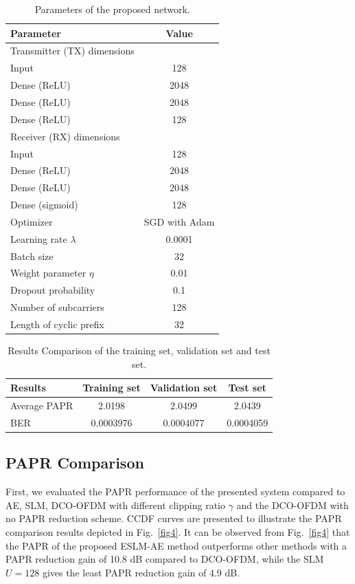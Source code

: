 \documentclass[conference]{IEEEtran}
\begin{document}
\begin{table}[htbp]
\caption{Parameters of the proposed network.}
\begin{center}
\begin{tabular}{|l|c|}
\hline
\textbf{Parameter} & \textbf{Value} \\
\hline
Transmitter (TX) dimensions & \\
Input & 128 \\
Dense (ReLU) & 2048 \\
Dense (ReLU) & 2048 \\
Dense (ReLU) & 128 \\
\hline
Receiver (RX) dimensions & \\
Input & 128 \\
Dense (ReLU) & 2048 \\
Dense (ReLU) & 2048 \\
Dense (sigmoid) & 128 \\
\hline
Optimizer & SGD with Adam \cite{b40} \\
Learning rate $\lambda$ & 0.0001 \\
Batch size & 32 \\
Weight parameter $\eta$ & 0.01 \\
Dropout probability & 0.1 \\
Number of subcarriers & 128 \\
Length of cyclic prefix & 32 \\
\hline
\end{tabular}
\label{tab1}
\end{center}
\end{table}

\begin{table}[htbp]
\caption{Results Comparison of the training set, validation set and test set.}
\begin{center}
\begin{tabular}{|l|c|c|c|}
\hline
\textbf{Results} & \textbf{Training set} & \textbf{Validation set} & \textbf{Test set} \\
\hline
Average PAPR & 2.0198 & 2.0499 & 2.0439 \\
BER & 0.0003976 & 0.0004077 & 0.0004059 \\
\hline
\end{tabular}
\label{tab2}
\end{center}
\end{table}

\subsection{PAPR Comparison}
First, we evaluated the PAPR performance of the presented system compared to AE, SLM, DCO-OFDM with different clipping ratio $\gamma$ and the DCO-OFDM with no PAPR reduction scheme. CCDF curves are presented to illustrate the PAPR comparison results depicted in Fig.~\ref{fig4}. It can be observed from Fig.~\ref{fig4} that the PAPR of the proposed ESLM-AE method outperforms other methods with a PAPR reduction gain of 10.8 dB compared to DCO-OFDM, while the SLM $U = 128$ gives the least PAPR reduction gain of 4.9 dB.
\end{document}
